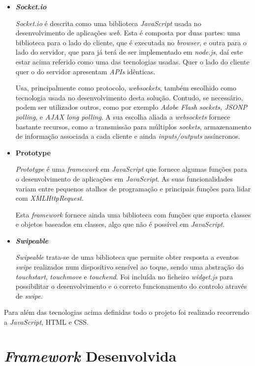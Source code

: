 \begin{itemize}
\item \textbf{\textit{Socket.io}}

\textit{Socket.io} é descrita como uma biblioteca \textit{JavaScript} usada no desenvolvimento de aplicações \textit{web}. Esta é composta por duas partes: uma biblioteca para o lado do cliente, que é executada no \textit{browser}, e outra para o lado do servidor, que para já terá de ser implementado em \textit{node.js}, daí este estar acima referido como uma das tecnologias usadas. Quer o lado do cliente quer o do servidor apresentam \textit{APIs} idênticas. 

Usa, principalmente como protocolo, \textit{websockets}, também escolhido como tecnologia usada no desenvolvimento desta solução. Contudo, se necessário, podem ser utilizados outros, como por exemplo \textit{Adobe Flash sockets, JSONP polling}, e \textit{AJAX long polling}. 
A sua escolha aliada a \textit{websockets} fornece bastante recursos, como a transmissão para múltiplos \textit{sockets}, armazenamento de informação associada a cada cliente e ainda \textit{inputs/outputs} assíncronos. 

\item \textbf{Prototype}

\textit{Prototype} é uma \textit{framework} em \textit{JavaScript} que fornece algumas funções para o desenvolvimento de aplicações em \textit{JavaScript}. As suas funcionalidades variam entre pequenos atalhos de programação e principais funções para lidar com \textit{XMLHttpRequest}.

Esta \textit{framework} fornece ainda uma biblioteca com funções que suporta classes e objetos baseados em classes, algo que não é possível em \textit{JavaScript}.

\item \textbf{\textit{Swipeable}}

\textit{Swipeable} trata-se de uma biblioteca que permite obter resposta a eventos \textit{swipe} realizados num dispositivo sensível ao toque, sendo uma abstração do \textit{touchstart}, \textit{touchmove} e \textit{touchend}. 
Foi incluída no ficheiro \textit{widget.js} para possibilitar o desenvolvimento e o correto funcionamento do controlo através de \textit{swipe}.

\end{itemize}

Para além das tecnologias acima definidas todo o projeto foi realizado recorrendo a \textit{JavaScript}, HTML e CSS. 


\section{\textit{Framework} Desenvolvida} \label{sec:framework}

